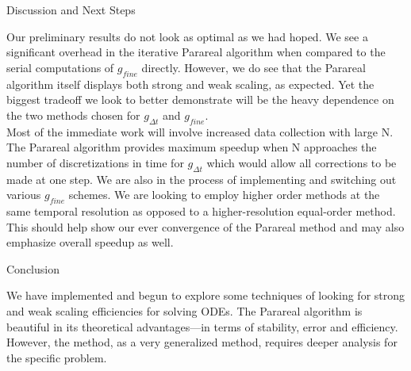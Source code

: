 \documentclass[final]{beamer}
\newlength{\onecolwid}
\begin{document}
\begin{frame}[t]
\begin{columns}[t]
\begin{column}{\onecolwid} %


\begin{block}{Discussion and Next Steps}

Our preliminary results do not look as optimal as we had hoped. We see a significant overhead in the iterative Parareal algorithm when compared to the serial computations of $g_{fine}$ directly.  However, we do see that the Parareal algorithm itself displays both strong and weak scaling, as expected. Yet the biggest tradeoff we look to better demonstrate will be the heavy dependence on the two methods chosen for $g_{\Delta t}$ and $g_{fine}$. \\ 

Most of the immediate work will involve increased data collection with large N. The Parareal algorithm provides maximum speedup when N approaches the number of discretizations in time for $g_{\Delta t}$ which would allow all corrections to be made at one step. We are also in the process of implementing and switching out various $g_{fine}$ schemes. We are looking to employ higher order methods at the same temporal resolution as opposed to a higher-resolution equal-order method. This should help show our ever convergence of the Parareal method and may also emphasize overall speedup as well.
\end{block}



\begin{alertblock}{Conclusion}

We have implemented and begun to explore some techniques of looking
for strong and weak scaling efficiencies for solving ODEs. The Parareal
algorithm is beautiful in its theoretical advantages---in terms of stability,
error and efficiency. However, the method, as a very generalized method,
requires deeper analysis for the specific problem. 


\end{alertblock}
\end{column}
\end{columns}
\end{frame}
\end{document}
